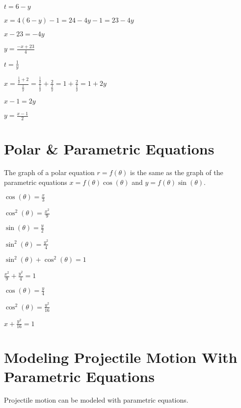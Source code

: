 \documentclass{report}
\begin{document}
$t=6-y$

$x=4(6-y)-1=24-4y-1=23-4y$

$x-23=-4y$

$\boxed{y=\frac{-x+23}{4}}$


$t=\frac{1}{y}$

$x=\frac{\frac{1}{y}+2}{\frac{1}{y}}=\frac{\frac{1}{y}}{\frac{1}{y}}+\frac{2}{\frac{1}{y}}=1+\frac{2}{\frac{1}{y}}=1+2y$

$x-1=2y$

$\boxed{y=\frac{x-1}{2}}$


\section{Polar \& Parametric Equations}

The graph of a polar equation $r=f(\theta)$ is the same as the graph of the parametric equations $x=f(\theta)\cos(\theta)$ and $y=f(\theta)\sin(\theta)$.


$\cos(\theta)=\frac{x}{3}$

$\cos^2(\theta)=\frac{x^2}{9}$

$\sin(\theta)=\frac{y}{2}$

$\sin^2(\theta)=\frac{y^2}{4}$

$\sin^2(\theta)+\cos^2(\theta)=1$

$\boxed{\frac{x^2}{9}+\frac{y^2}{4}=1}$


$\cos(\theta)=\frac{y}{4}$

$\cos^2(\theta)=\frac{y^2}{16}$

$\boxed{x+\frac{y^2}{16}=1}$

\section{Modeling Projectile Motion With Parametric Equations}

Projectile motion can be modeled with parametric equations.
\end{document}
